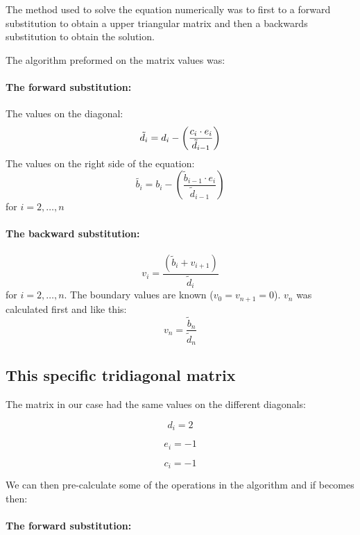 The method used to solve the equation numerically was to first to a forward substitution to obtain a upper triangular matrix and then a backwards substitution to obtain the solution.

The algorithm preformed on the matrix values was:

\paragraph{The forward substitution:\hspace{4cm}}

\hspace{1cm}\linebreak
The values on the diagonal:
\[
\tilde{d_i} =  d_i - \left(\frac{c_i \cdot e_i}{\tilde{d}_{i-1}}\right)\linebreak
\]
The values on the right side of the equation:
\[
\tilde{b_i} =  b_i - \left(\frac{\tilde{b}_{i-1} \cdot e_i}{\tilde{d}_{i-1}}\right)
\]
for $i = 2, \dots, n $

\paragraph{The backward substitution:\hspace{4cm}}

\hspace{1cm}\linebreak
\[
v_i = \frac{\left(\tilde{b}_i + v_{i+1}\right)}{\tilde{d}_i}
\]
for $i = 2, \dots, n $. The boundary values are known ($v_0 = v_{n+1} = 0$). $v_{n}$ was calculated first and like this:
\[
v_{n} = \frac{\tilde{b}_{n}}{\tilde{d}_{n}}
\]

\subsection{This specific tridiagonal matrix}

The matrix in our case had the same values on the different diagonals:
\begin{multicols}{3}
\[
d_i = 2
\]

\[
e_i = -1
\]

\[
c_i = -1
\]
\end{multicols}

We can then pre-calculate some of the operations in the algorithm and if becomes then:

\paragraph{The forward substitution:\hspace{4cm}}


